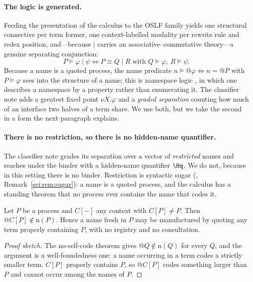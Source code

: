 \paragraph{The logic is generated.} Feeding the presentation of the \rh{}
calculus to the OSLF family yields one structural connective per term former,
one context-labelled modality per rewrite rule and redex position, and---because
$\mid$ carries an associative--commutative theory---a genuine separating
conjunction:
\[
P \models \varphi \mid \psi \iff P \equiv Q \mid R \text{ with } Q \models
\varphi,\ R \models \psi .
\]
Because a name is a quoted process, the name predicate $n \models @\varphi \iff
n = @P$ with $P \models \varphi$ sees into the structure of a name; this is
namespace logic \cite{NamespaceLogic}, in which one describes a namespace by a property
rather than enumerating it. The classifier note \cite{ClassifierNote} adds a
greatest fixed point $\nu X.\varphi$ and a \emph{graded separation} counting how
much of an interface two halves of a term share. We use both, but we take the
second in a form the next paragraph explains.

\paragraph{There is no restriction, so there is no hidden-name quantifier.}
The classifier note grades its separation over a vector of \emph{restricted}
names and reaches under the binder with a hidden-name quantifier $\Hq$. We do
not, because in this setting there is no binder. Restriction is syntactic sugar
(\chSci, Remark~\ref{sci:rem:sugar}): a name is a quoted process, and the calculus has a
standing theorem that no process ever contains the name that codes it.

\begin{proposition}\label{gam:prop:fresh}
Let $P$ be a process and $C[-]$ any context with $C[P] \neq P$. Then
$@C[P] \notin \mathrm{n}(P)$. Hence a name fresh in $P$ may be manufactured by
quoting any term properly containing $P$, with no registry and no consultation.
\end{proposition}
\begin{proof}[Proof sketch]
The no-self-code theorem gives $@Q \notin \mathrm{n}(Q)$ for every $Q$, and the
argument is a well-foundedness one: a name occurring in a term codes a strictly
smaller term. $C[P]$ properly contains $P$, so $@C[P]$ codes something larger
than $P$ and cannot occur among the names of $P$.
\end{proof}

